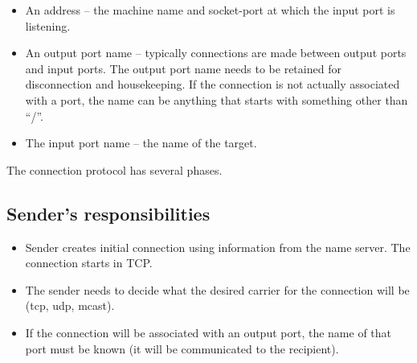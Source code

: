 \documentclass[a4]{article}
\begin{document}
\begin{itemize}

\item An address -- the machine name and socket-port at which
the input port is listening.

\item An output port name -- typically connections are made
between output ports and input ports.  The output port name
needs to be retained for disconnection and housekeeping.
If the connection is not actually associated with a port,
the name can be anything that starts with something
other than ``/''.

\item The input port name -- the name of the target.

\end{itemize}


The connection protocol has several phases.

\subsection{Sender's responsibilities}

\begin{itemize}

\item Sender creates initial connection using information 
from the name server.  The connection starts in TCP.

\item The sender needs to decide what the desired carrier
for the connection will be (tcp, udp, mcast).

\item If the connection will be associated with an output port, the
name of that port must be known (it will be communicated to the
recipient).

\end{itemize}
\end{document}

